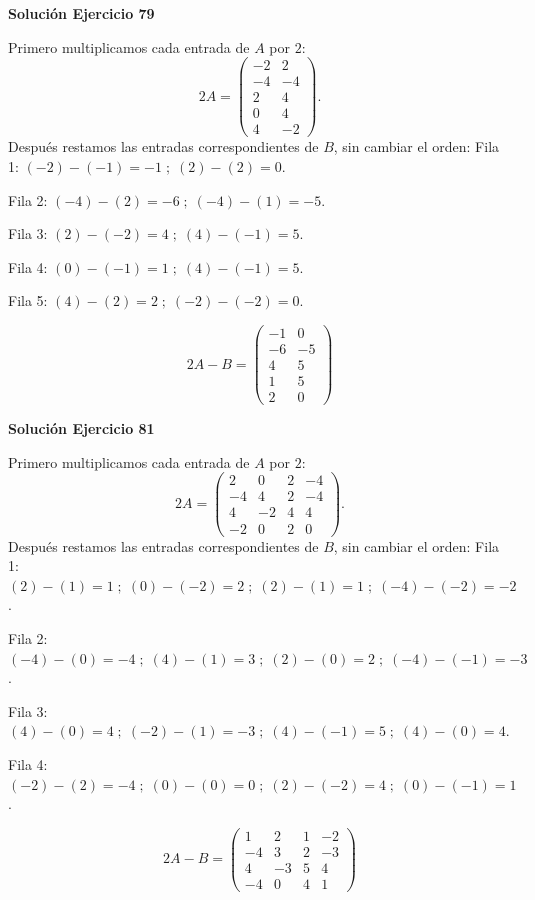 \par\bigskip\noindent\textbf{Solución Ejercicio 79}\par\nobreak
Primero multiplicamos cada entrada de $A$ por $2$:
\[
2A=\begin{pmatrix}-2&2\\-4&-4\\2&4\\0&4\\4&-2\end{pmatrix}.
\]
Después restamos las entradas correspondientes de $B$, sin cambiar el orden:
Fila 1: $(-2)-(-1)=-1\; ;\; (2)-(2)=0$.

Fila 2: $(-4)-(2)=-6\; ;\; (-4)-(1)=-5$.

Fila 3: $(2)-(-2)=4\; ;\; (4)-(-1)=5$.

Fila 4: $(0)-(-1)=1\; ;\; (4)-(-1)=5$.

Fila 5: $(4)-(2)=2\; ;\; (-2)-(-2)=0$.

\[
\boxed{2A-B=\begin{pmatrix}-1&0\\-6&-5\\4&5\\1&5\\2&0\end{pmatrix}}
\]

\par\bigskip\noindent\textbf{Solución Ejercicio 81}\par\nobreak
Primero multiplicamos cada entrada de $A$ por $2$:
\[
2A=\begin{pmatrix}2&0&2&-4\\-4&4&2&-4\\4&-2&4&4\\-2&0&2&0\end{pmatrix}.
\]
Después restamos las entradas correspondientes de $B$, sin cambiar el orden:
Fila 1: $(2)-(1)=1\; ;\; (0)-(-2)=2\; ;\; (2)-(1)=1\; ;\; (-4)-(-2)=-2$.

Fila 2: $(-4)-(0)=-4\; ;\; (4)-(1)=3\; ;\; (2)-(0)=2\; ;\; (-4)-(-1)=-3$.

Fila 3: $(4)-(0)=4\; ;\; (-2)-(1)=-3\; ;\; (4)-(-1)=5\; ;\; (4)-(0)=4$.

Fila 4: $(-2)-(2)=-4\; ;\; (0)-(0)=0\; ;\; (2)-(-2)=4\; ;\; (0)-(-1)=1$.

\[
\boxed{2A-B=\begin{pmatrix}1&2&1&-2\\-4&3&2&-3\\4&-3&5&4\\-4&0&4&1\end{pmatrix}}
\]

